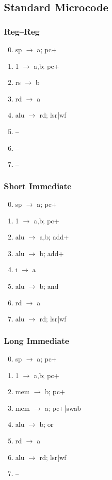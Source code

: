 \documentclass[11pt]{book}
\begin{document}
\subsection*{Standard Microcode}
\begin{multicols}{3}\ttfamily\selectfont\small
  \subsubsection*{Reg--Reg}
  \begin{enumerate}\setcounter{enumi}{-1}
  \item sp \(\rightarrow\) a; pc+
  \item 1 \(\rightarrow\) a,b; pc+
  \item rs \(\rightarrow\) b
  \item rd \(\rightarrow\) a
  \item alu \(\rightarrow\) rd; lsr|wf
  \item --
  \item --
  \item --
  \end{enumerate}
  \columnbreak
  \subsubsection*{Short Immediate}
  \begin{enumerate}\setcounter{enumi}{-1}
  \item sp \(\rightarrow\) a; pc+
  \item 1 \(\rightarrow\) a,b; pc+
  \item alu \(\rightarrow\) a,b; add+
  \item alu \(\rightarrow\) b; add+
  \item i \(\rightarrow\) a
  \item alu \(\rightarrow\) b; and
  \item rd \(\rightarrow\) a
  \item alu \(\rightarrow\) rd; lsr|wf
  \end{enumerate}
  \columnbreak
  \subsubsection*{Long Immediate}
  \begin{enumerate}\setcounter{enumi}{-1}
  \item sp \(\rightarrow\) a; pc+
  \item 1 \(\rightarrow\) a,b; pc+
  \item mem \(\rightarrow\) b; pc+
  \item mem \(\rightarrow\) a; pc+|swab
  \item alu \(\rightarrow\) b; or
  \item rd \(\rightarrow\) a
  \item alu \(\rightarrow\) rd; lsr|wf
  \item --
  \end{enumerate}
\end{multicols}
\end{document}
